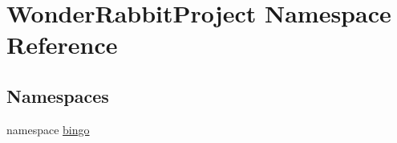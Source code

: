 \hypertarget{namespaceWonderRabbitProject}{\section{Wonder\-Rabbit\-Project Namespace Reference}
\label{namespaceWonderRabbitProject}
}
\subsection*{Namespaces}
\begin{DoxyCompactItemize}
\item 
namespace \hyperlink{namespaceWonderRabbitProject_1_1bingo}{bingo}
\end{DoxyCompactItemize}
